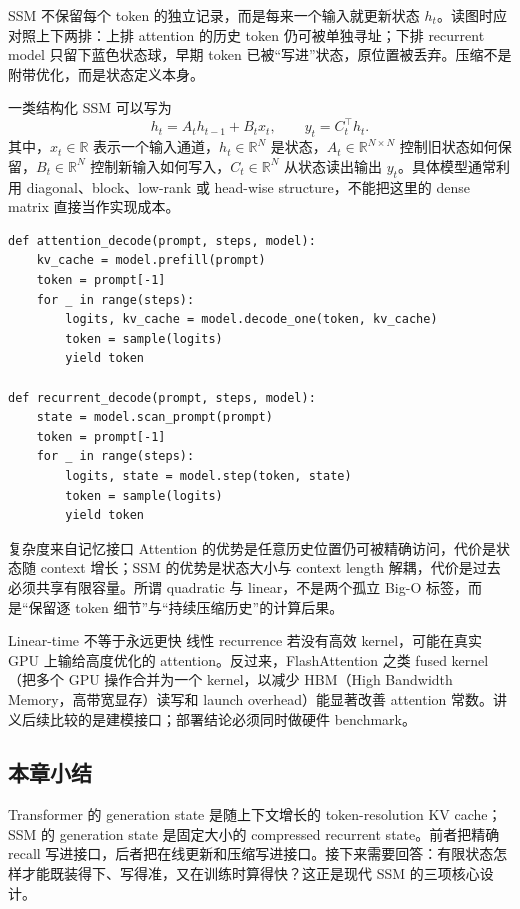 SSM 不保留每个 token 的独立记录，而是每来一个输入就更新状态 $h_t$。读图时应对照上下两排：上排 attention 的历史 token 仍可被单独寻址；下排 recurrent model 只留下蓝色状态球，早期 token 已被“写进”状态，原位置被丢弃。压缩不是附带优化，而是状态定义本身。


一类结构化 SSM 可以写为
\[
h_t=A_t h_{t-1}+B_t x_t,
\qquad
y_t=C_t^{\top}h_t.
\]
其中，$x_t\in\mathbb{R}$ 表示一个输入通道，$h_t\in\mathbb{R}^{N}$ 是状态，$A_t\in\mathbb{R}^{N\times N}$ 控制旧状态如何保留，$B_t\in\mathbb{R}^{N}$ 控制新输入如何写入，$C_t\in\mathbb{R}^{N}$ 从状态读出输出 $y_t$。具体模型通常利用 diagonal、block、low-rank 或 head-wise structure，不能把这里的 dense matrix 直接当作实现成本。

\begin{lstlisting}[caption={Attention cache 与 recurrent state 的解码接口对比}]
def attention_decode(prompt, steps, model):
    kv_cache = model.prefill(prompt)
    token = prompt[-1]
    for _ in range(steps):
        logits, kv_cache = model.decode_one(token, kv_cache)
        token = sample(logits)
        yield token

def recurrent_decode(prompt, steps, model):
    state = model.scan_prompt(prompt)
    token = prompt[-1]
    for _ in range(steps):
        logits, state = model.step(token, state)
        token = sample(logits)
        yield token
\end{lstlisting}

\begin{importantbox}{复杂度来自记忆接口}
Attention 的优势是任意历史位置仍可被精确访问，代价是状态随 context 增长；SSM 的优势是状态大小与 context length 解耦，代价是过去必须共享有限容量。所谓 quadratic 与 linear，不是两个孤立 Big-O 标签，而是“保留逐 token 细节”与“持续压缩历史”的计算后果。
\end{importantbox}

\begin{warningbox}{Linear-time 不等于永远更快}
线性 recurrence 若没有高效 kernel，可能在真实 GPU 上输给高度优化的 attention。反过来，FlashAttention 之类 fused kernel（把多个 GPU 操作合并为一个 kernel，以减少 HBM（High Bandwidth Memory，高带宽显存）读写和 launch overhead）能显著改善 attention 常数。讲义后续比较的是建模接口；部署结论必须同时做硬件 benchmark。
\end{warningbox}

\subsection{本章小结}

Transformer 的 generation state 是随上下文增长的 token-resolution KV cache；SSM 的 generation state 是固定大小的 compressed recurrent state。前者把精确 recall 写进接口，后者把在线更新和压缩写进接口。接下来需要回答：有限状态怎样才能既装得下、写得准，又在训练时算得快？这正是现代 SSM 的三项核心设计。

